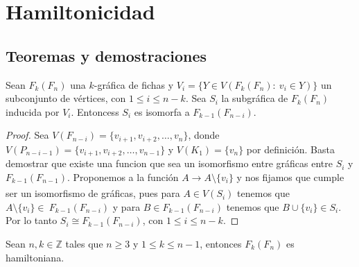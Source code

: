 \chapter{Hamiltonicidad}%
\label{cap:hamilt}

\section{Teoremas y demostraciones}%

\begin{proposicion}
        \label{prop:iso-SFan}
            Sean $F_k(F_n)$ una $k$-gr\'afica de fichas y $V_i=\{ Y \in
            V(F_k(F_n) \colon\ v_i \in Y) \}$ un subconjunto de v\'ertices, con
            $1 \leq i \leq n-k$. Sea $S_i$ la subgr\'afica de $F_k(F_n)$
            inducida  por $V_i$. Entoncess $S_i$ es isomorfa a
            $F_{k-1}(F_{n-i})$.
        \end{proposicion}
    
        \begin{proof}
            Sea $V(F_{n-i}) = \{v_{i+1}, v_{i+2}, \dots, v_n\}$, donde
            $V(P_{n-i-1}) = \{v_{i+1}, v_{i+2}, \dots, v_{n-1}\}$ y $V(K_1)=
            \{v_n\}$ por definici\'on. Basta demostrar que existe una funcion
            que sea un isomorfismo entre gr\'aficas entre $S_i$ y
            $F_{k-1}(F_{n-1})$. Proponemos a la funci\'on $A \xrightarrow[]{} A
            \setminus \{v_i\}$ y nos fijamos que cumple ser un isomorfismo de
            gr\'aficas, pues para $A \in V(S_i)$ tenemos que $A \setminus
            \{v_i\} \in \ F_{k-1}(F_{n-i})$  y para $B \in F_{k-1}(F_{n-i})$
            tenemos que $B \cup \{v_i\} \in S_i$. Por lo tanto $S_i \cong
            F_{k-1}(F_{n-i})$, con $1 \leq i \leq n-k$.
        \end{proof}
    
        \begin{teorema}
        \label{teo:hamilt-SFan}
            Sean $n,k \in \mathbb{Z}$ tales que $n \geq 3$ y $1 \leq k \leq n-1$,
            entonces $F_k(F_n)$ es hamiltoniana.
        \end{teorema}
    
